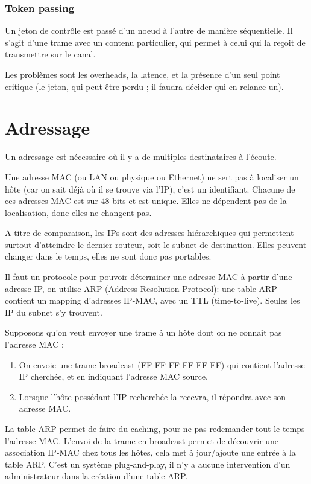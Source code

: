 		\subsubsection{Token passing}
		
		
		Un jeton de contrôle est passé d'un noeud à l'autre de manière séquentielle. Il s'agit d'une trame avec un contenu particulier, qui permet à celui qui la reçoit de transmettre sur le canal.
		
		Les problèmes sont les overheads, la latence, et la présence d'un seul point critique (le jeton, qui peut être perdu ; il faudra décider qui en relance un).
	
\section{Adressage}

Un adressage est nécessaire où il y a de multiples destinataires à l'écoute.


Une adresse MAC (ou LAN ou physique ou Ethernet) ne sert pas à localiser un hôte (car on sait déjà où il se trouve via l'IP), c'est un identifiant. Chacune de ces adresses MAC est sur 48 bits et est unique. Elles ne dépendent pas de la localisation, donc elles ne changent pas.

A titre de comparaison, les IPs sont des adresses hiérarchiques qui permettent surtout d'atteindre le dernier routeur, soit le subnet de destination. Elles peuvent changer dans le temps, elles ne sont donc pas portables.

Il faut un protocole pour pouvoir déterminer une adresse MAC à partir d'une adresse IP, on utilise ARP (Address Resolution Protocol): une table ARP contient un mapping d'adresses IP-MAC, avec un TTL (time-to-live). Seules les IP du subnet s'y trouvent.


Supposons qu'on veut envoyer une trame à un hôte dont on ne connaît pas l'adresse MAC :

\begin{enumerate}
	\item On envoie une trame broadcast (FF-FF-FF-FF-FF-FF) qui contient l'adresse IP cherchée, et en indiquant l'adresse MAC source.
	\item Lorsque l'hôte possédant l'IP recherchée la recevra, il répondra avec son adresse MAC.
\end{enumerate}

La table ARP permet de faire du caching, pour ne pas redemander tout le temps l'adresse MAC. L'envoi de la trame en broadcast permet de découvrir une association IP-MAC chez tous les hôtes, cela met à jour/ajoute une entrée à la table ARP. C'est un système plug-and-play, il n'y a aucune intervention d'un administrateur dans la création d'une table ARP.

